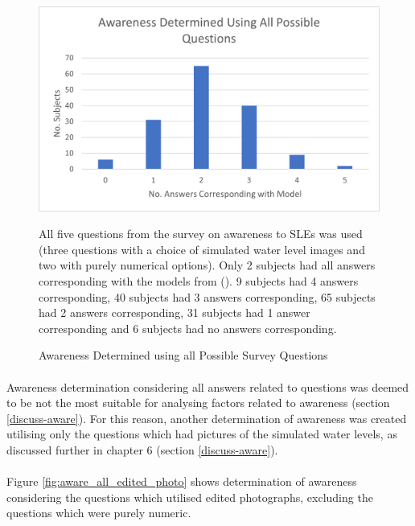 \begin{figure}[H]
    \centering
    \includegraphics{fig_results/aware_all.png}
    \caption{Awareness Determined using all Possible Survey Questions}{All five questions from the survey on awareness to SLEs was used (three questions with a choice of simulated water level images and two with purely numerical options). Only 2 subjects had all answers corresponding with the models from (\cite{kartverket_se_2021}). 9 subjects had 4 answers corresponding, 40 subjects had 3 answers corresponding, 65 subjects had 2 answers corresponding, 31 subjects had 1 answer corresponding and 6 subjects had no answers corresponding. }
    \label{fig:aware_all_qs}
\end{figure}
\paragraph{}

Awareness determination considering all answers related to questions was deemed to be not the most suitable for analysing factors related to awareness (section \ref{discuss-aware}). For this reason, another determination of awareness was created utilising only the questions which had pictures of the simulated water levels, as discussed further in chapter 6 (section \ref{discuss-aware}). 
\paragraph{}

Figure \ref{fig:aware_all_edited_photo} shows determination of awareness considering the questions which utilised edited photographs, excluding the questions which were purely numeric. 

